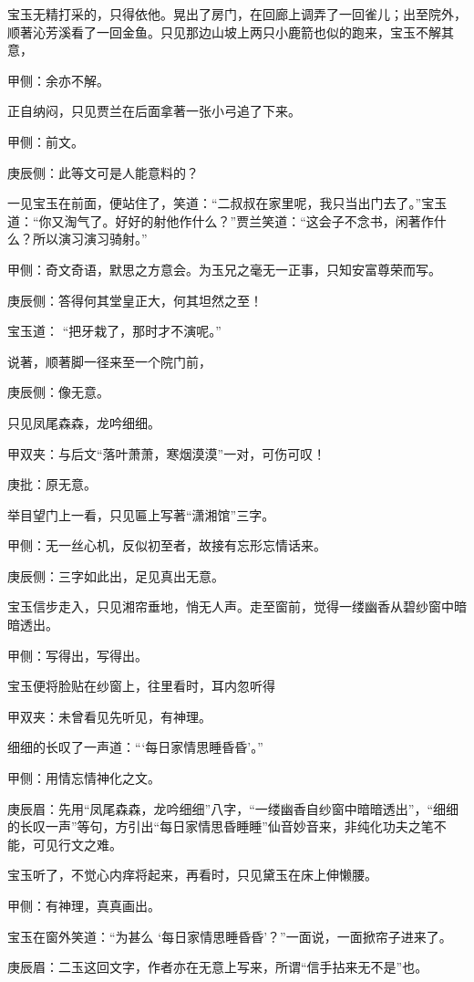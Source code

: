 \begin{parag}
    宝玉无精打采的，只得依他。晃出了房门，在回廊上调弄了一回雀儿；出至院外，顺著沁芳溪看了一回金鱼。只见那边山坡上两只小鹿箭也似的跑来，宝玉不解其意，\begin{note}甲侧：余亦不解。\end{note}正自纳闷，只见贾兰在后面拿著一张小弓追了下来。\begin{note}甲侧：前文。\end{note}\begin{note}庚辰侧：此等文可是人能意料的？\end{note}一见宝玉在前面，便站住了，笑道：“二叔叔在家里呢，我只当出门去了。”宝玉道：“你又淘气了。好好的射他作什么？”贾兰笑道：“这会子不念书，闲著作什么？所以演习演习骑射。”\begin{note}甲侧：奇文奇语，默思之方意会。为玉兄之毫无一正事，只知安富尊荣而写。\end{note}\begin{note}庚辰侧：答得何其堂皇正大，何其坦然之至！\end{note}宝玉道： “把牙栽了，那时才不演呢。”
\end{parag}


\begin{parag}
    说著，顺著脚一径来至一个院门前，\begin{note}庚辰侧：像无意。\end{note}只见凤尾森森，龙吟细细。\begin{note}甲双夹：与后文“落叶萧萧，寒烟漠漠”一对，可伤可叹！\end{note}\begin{note}庚批：原无意。\end{note}举目望门上一看，只见匾上写著“潇湘馆”三字。\begin{note}甲侧：无一丝心机，反似初至者，故接有忘形忘情话来。\end{note}\begin{note}庚辰侧：三字如此出，足见真出无意。\end{note}宝玉信步走入，只见湘帘垂地，悄无人声。走至窗前，觉得一缕幽香从碧纱窗中暗暗透出。\begin{note}甲侧：写得出，写得出。\end{note}宝玉便将脸贴在纱窗上，往里看时，耳内忽听得\begin{note}甲双夹：未曾看见先听见，有神理。\end{note}细细的长叹了一声道：“‘每日家情思睡昏昏’。”\begin{note}甲侧：用情忘情神化之文。\end{note}\begin{note}庚辰眉：先用“凤尾森森，龙吟细细”八字，“一缕幽香自纱窗中暗暗透出”，“细细的长叹一声”等句，方引出“每日家情思昏睡睡”仙音妙音来，非纯化功夫之笔不能，可见行文之难。\end{note}宝玉听了，不觉心内痒将起来，再看时，只见黛玉在床上伸懒腰。\begin{note}甲侧：有神理，真真画出。\end{note}宝玉在窗外笑道：“为甚么 ‘每日家情思睡昏昏’？”一面说，一面掀帘子进来了。\begin{note}庚辰眉：二玉这回文字，作者亦在无意上写来，所谓“信手拈来无不是”也。\end{note}
\end{parag}


